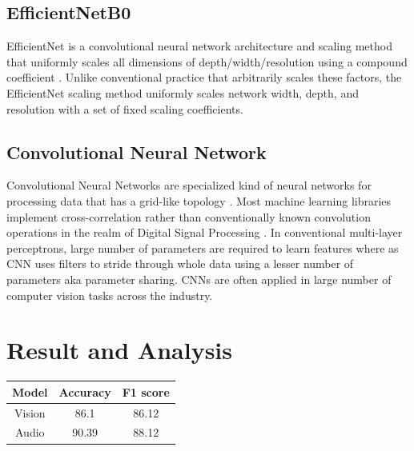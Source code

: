 \documentclass[fleqn, 10pt, twoside]{IOEGC}
\begin{document}
\subsection{EfficientNetB0}
EfficientNet is a convolutional neural network architecture and scaling method that uniformly scales all dimensions of depth/width/resolution using a compound coefficient \cite{r7}.
Unlike conventional practice that arbitrarily scales these factors, the EfficientNet scaling method uniformly scales network width, depth, and resolution with a set of fixed scaling
coefficients.
\par
\subsection{ Convolutional Neural Network}
Convolutional Neural Networks are specialized kind of neural networks for processing
data that has a grid-like topology \cite{r8}. Most machine learning libraries implement cross-correlation rather than conventionally known convolution operations in the realm of Digital
Signal Processing . In conventional multi-layer perceptrons, large number of parameters are required to learn features where as CNN uses filters to stride through whole data using a lesser number of parameters aka parameter sharing. CNNs are often applied
in large number of computer vision tasks across the industry.

\section{Result and Analysis}

\begin{center}
	\begin{tabular}{ |c|c|c| }
		\hline
		Model  & Accuracy & F1 score \\
		\hline
		Vision & 86.1     & 86.12    \\
		\hline
		Audio  & 90.39    & 88.12    \\

		\hline
	\end{tabular}

\end{center}
\end{document}
